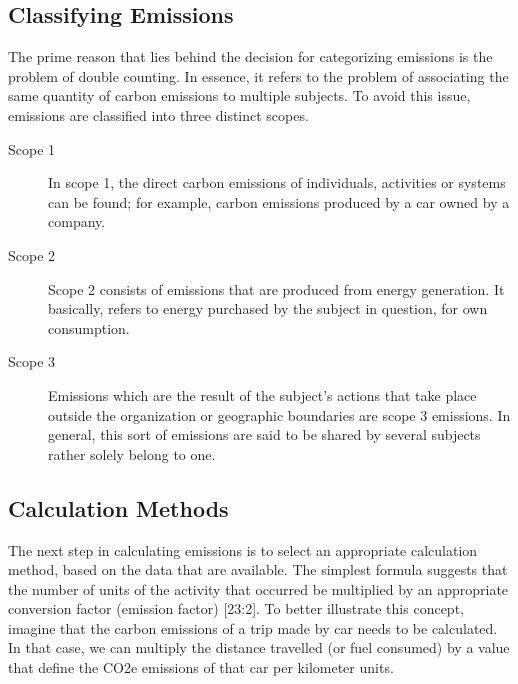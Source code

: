\subsection{Classifying Emissions}
The prime reason that lies behind the decision for categorizing emissions is the problem of double counting. In essence, it refers to the problem of associating the same quantity of carbon emissions to multiple subjects\cite{reference23:25}. To avoid this issue, emissions are classified into three distinct scopes.

\begin{description}
  \item[Scope 1]
        In scope 1, the direct carbon emissions of individuals, activities or systems can be found; for example, carbon emissions produced by a car owned by a company.
  \item[Scope 2]
        Scope 2 consists of emissions that are produced from energy generation. It basically, refers to energy purchased by the subject in question, for own consumption.
  \item[Scope 3]
        Emissions which are the result of the subject's actions that take place outside the organization or geographic boundaries are scope 3 emissions. In general, this sort of emissions are said to be shared by several subjects rather solely belong to one.
\end{description}


\subsection{Calculation Methods}

The next step in calculating emissions is to select an appropriate calculation method, based on the data that are available. The simplest formula suggests that the number of units of the activity that occurred be multiplied by an appropriate conversion factor (emission factor) [23:2]. To better illustrate this concept, imagine that the carbon emissions of a trip made by car needs to be calculated. In that case, we can multiply the distance travelled (or fuel consumed) by a value that define the CO2e emissions of that car per kilometer units.

